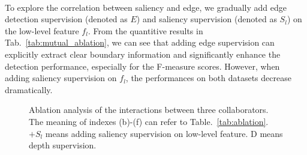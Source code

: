 \documentclass[runningheads]{llncs}
\begin{document}
\\
To explore the correlation between saliency and edge, we gradually add edge detection supervision (denoted as $E$) and saliency supervision (denoted as $S_l$) on the low-level feature $f_l$.
From the quantitive results in Tab.~\ref{tab:mutual_ablation}, we can see that adding edge supervision can explicitly extract clear boundary information and significantly enhance the detection performance, especially for the F-measure scores.
However, when adding saliency supervision on $f_l$, the performances on both datasets decrease dramatically.
\begin{wrapfigure}{r}{0.52\textwidth}
\begin{minipage}[t]{0.52\textwidth}
\vspace{0.15cm}
	\begin{minipage}[t]{1\textwidth}
  \centering
  \vspace{-1.1cm}
     \makeatletter{}\makeatother\caption{Ablation analysis of the interactions between three collaborators. The meaning of indexes (b)-(f) can refer to Table.~\ref{tab:ablation}. $+S_l$ means adding saliency supervision on low-level feature. D means depth supervision.}
\vspace{0.25cm}
\end{minipage}
\end{minipage}
\end{wrapfigure}
\end{document}
